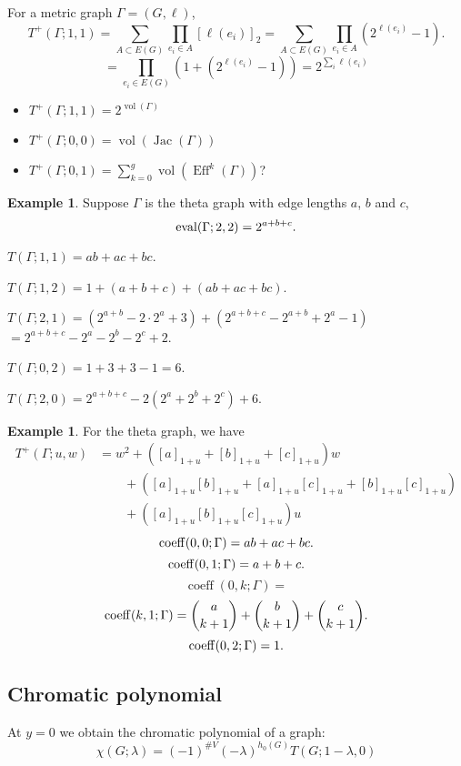 \documentclass{amsart}
\theoremstyle{definition}
\newtheorem{eg}[thm]{Example}
\DeclareMathOperator{\Eff}{Eff}
\DeclareMathOperator{\Jac}{Jac}
\DeclareMathOperator{\vol}{vol}
\DeclareMathOperator{\coeff}{coeff}
\begin{document}
For a metric graph $\Gamma = (G,\ell)$,
\[ T^+(\Gamma;1,1) = \sum_{A \subset E(G)} \prod_{e_i \in A} [\ell(e_i)]_{2}
= \sum_{A \subset E(G)} \prod_{e_i \in A} (2^{\ell(e_i)} - 1) .\]
\[ = \prod_{e_i \in E(G)} (1 + (2^{\ell(e_i)} - 1))
 = 2^{\sum_i \ell(e_i)}\]
\begin{itemize}
\item 
$T^+(\Gamma;1,1) = 2^{\vol(\Gamma)}$

\item 
$T^+(\Gamma;0,0) = \vol(\Jac(\Gamma))$

\item 
$T^+(\Gamma;0,1) = \sum_{k=0}^g \vol(\Eff^k(\Gamma))$?

\end{itemize}

\begin{eg}
Suppose $\Gamma$ is the theta graph with edge lengths $a$, $b$ and $c$,
\[ {\rm eval}(\Gamma; 2,2) = 2^{a+b+c} .\]

$T(\Gamma; 1,1) = ab + ac + bc$.

$T(\Gamma; 1,2) = 1 + (a + b + c) + (ab + ac + bc)$.

$T(\Gamma; 2,1) = (2^{a+b}  -2\cdot 2^a + 3) + (2^{a+b+c}-2^{a+b} + 2^a - 1)$
$= 2^{a+b+c} - 2^a - 2^b - 2^c + 2$.

$T(\Gamma; 0,2) = 1 + 3 + 3 - 1 = 6$.

$T(\Gamma; 2,0) = 2^{a+b+c} - 2(2^a + 2^b + 2^c) + 6$.
\end{eg}

\begin{eg}
For the theta graph, we have
\begin{align*}
T^+(\Gamma; u,w) &= w^2 + ([a]_{1+u} + [b]_{1+u} + [c]_{1+u})w  \\
&\qquad + ([a]_{1+u} [b]_{1+u} + [a]_{1+u} [c]_{1+u}  + [b]_{1+u} [c]_{1+u}) \\
&\qquad + ([a]_{1+u} [b]_{1+u} [c]_{1+u})u
\end{align*}
$$ {\rm coeff}(0,0; \Gamma) = ab + ac + bc .$$
$$ {\rm coeff}(0,1; \Gamma) = a + b + c .$$
$$ \coeff(0,k; \Gamma) = $$
$$ {\rm coeff}(k,1; \Gamma) = \binom{a}{k+1} + \binom{b}{k+1} + \binom{c}{k+1} .$$
$$ {\rm coeff}(0,2; \Gamma) = 1 .$$

\end{eg}

\subsection{Chromatic polynomial}
At $y=0$ we obtain the chromatic polynomial of a graph:
\begin{equation*}
\chi(G; \lambda) = (-1)^{\#V } (-\lambda)^{h_0(G)} T(G; 1-\lambda,0)
\end{equation*}
\end{document}
